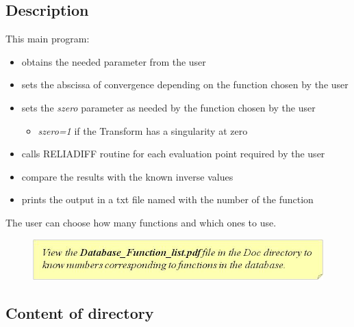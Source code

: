 \documentclass[10pt]{article}
\begin{document}
\subsection{Description}
This main program:
      \begin{itemize}
      \item obtains the needed parameter from the user
	\item sets the abscissa of convergence depending on the function chosen by the user
	\item sets the \emph{szero} parameter as needed by the function chosen by the user
		  \begin{itemize}
		  \item \emph{szero=1} if the Transform has a singularity at zero
		  \end{itemize}

      \item calls RELIADIFF routine for each evaluation point required by the user
      \item compare the results with the known inverse values
      \item prints the output in a txt file named with the number of the function
      \end{itemize}

The user can choose how many functions and which ones to use.

\begin{figure}[!h]
\begin{flushright}
\includegraphics[scale=0.8]{Immagine7}
\end{flushright}
\end{figure}

\subsection{Content of directory}
\end{document}
